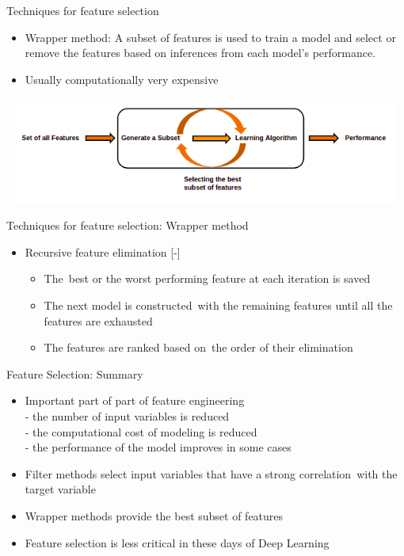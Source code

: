 \documentclass[aspectratio=169,14pt,usenames,dvipsnames]{beamer}
\begin{document}
\begin{frame}{Techniques for feature selection}
\begin{itemize}
\item Wrapper method: A subset of features is used to train a model and select or remove the features based on inferences from each model's performance.\\
\item Usually computationally very expensive
\end{itemize}
\centering
\includegraphics[width=14cm , height=3.5cm]{Images/AIML_FD_IMG9.png}
\end{frame}

\begin{frame}{Techniques for feature selection: Wrapper method}
\begin{itemize}
\item Recursive feature elimination
[-]
\begin{itemize}
\item The best or the worst performing feature at each iteration is saved
\item The next model is constructed with the remaining features until all the features are exhausted
\item The features are ranked based on the order of their elimination
\end{itemize}
\end{itemize}
\end{frame}

\begin{frame}{Feature Selection: Summary}
\begin{itemize}
\item Important part of part of feature engineering\\
- the number of input variables is reduced\\
- the computational cost of modeling is reduced\\
- the performance of the model improves in some cases\\

\item Filter methods select input variables that have a strong correlation with the target variable
\item Wrapper methods provide the best subset of features
\item Feature selection is less critical in these days of Deep Learning
\end{itemize}
\end{frame}
\end{document}
